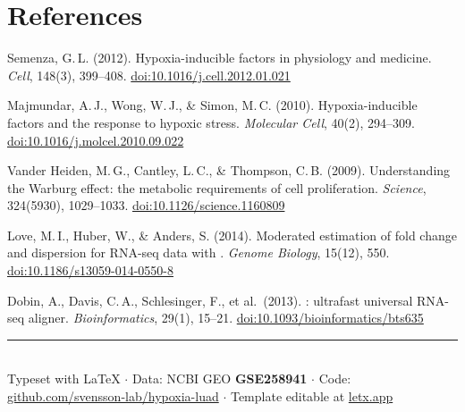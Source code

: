 \section{References}

\begingroup
\small
\setlength{\parskip}{3pt}
\begin{enumerate}[label={[\arabic*]}, leftmargin=*, itemsep=2pt]

\item Semenza, G.\,L. (2012). Hypoxia-inducible factors in physiology and medicine.
\textit{Cell}, 148(3), 399--408.
\href{https://doi.org/10.1016/j.cell.2012.01.021}{doi:10.1016/j.cell.2012.01.021}

\item Majmundar, A.\,J., Wong, W.\,J., \& Simon, M.\,C. (2010).
Hypoxia-inducible factors and the response to hypoxic stress.
\textit{Molecular Cell}, 40(2), 294--309.
\href{https://doi.org/10.1016/j.molcel.2010.09.022}{doi:10.1016/j.molcel.2010.09.022}

\item Vander Heiden, M.\,G., Cantley, L.\,C., \& Thompson, C.\,B. (2009).
Understanding the Warburg effect: the metabolic requirements of cell proliferation.
\textit{Science}, 324(5930), 1029--1033.
\href{https://doi.org/10.1126/science.1160809}{doi:10.1126/science.1160809}

\item Love, M.\,I., Huber, W., \& Anders, S. (2014).
Moderated estimation of fold change and dispersion for RNA-seq data with .
\textit{Genome Biology}, 15(12), 550.
\href{https://doi.org/10.1186/s13059-014-0550-8}{doi:10.1186/s13059-014-0550-8}

\item Dobin, A., Davis, C.\,A., Schlesinger, F., et al.\ (2013).
: ultrafast universal RNA-seq aligner.
\textit{Bioinformatics}, 29(1), 15--21.
\href{https://doi.org/10.1093/bioinformatics/bts635}{doi:10.1093/bioinformatics/bts635}

\end{enumerate}
\endgroup

\vspace{4pt}
\begin{center}
\textcolor{rulegrey}{\rule{0.4\linewidth}{0.5pt}}\\[3pt]
{\scriptsize\color{midgrey}
Typeset with \LaTeX{} $\cdot$ Data: NCBI GEO \textbf{GSE258941}
$\cdot$ Code: \href{https://github.com/svensson-lab/hypoxia-luad}{github.com/svensson-lab/hypoxia-luad}
$\cdot$ Template editable at \href{https://letx.app}{letx.app}}
\end{center}
